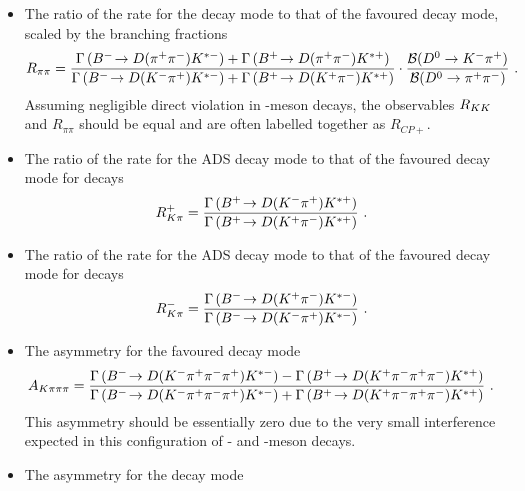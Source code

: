 \begin{itemize}
{{\begin{equation}
\label{eqn:Rkk}
\end{equation}
}}
\item{The ratio of the rate for the \decay{\D}{\pip\pim} decay mode to that of the favoured decay mode, scaled by the branching fractions
{\footnotesize
\begin{equation}
R_{\pi\pi} = \frac{\Gamma\left({{{B}^-}}\!\rightarrow {\ensuremath{D}}({{\pi}^+}{{\pi}^-}){{K}^{*-}}\right) + \Gamma\left({{{B}^+}}\!\rightarrow {\ensuremath{D}}({{\pi}^+}{{\pi}^-}){{K}^{*+}}\right)}{\Gamma\left({{{B}^-}}\!\rightarrow {\ensuremath{D}}({{K}^-}{{\pi}^+}){{K}^{*-}}\right) + \Gamma\left({{{B}^+}}\!\rightarrow {\ensuremath{D}}({{K}^+}{{\pi}^-}){{K}^{*+}}\right)} \cdot \frac{{\mathcal{B}}(D^0 \rightarrow K^-\pi^+)}{{\mathcal{B}}(D^0 \rightarrow \pi^+\pi^-)} \text{ . }
\label{eqn:Rpipi}
\end{equation}}
}
Assuming negligible direct \CP violation in \D-meson decays, the observables $R_{{K}{K}}$ and $R_{\pi\pi}$ should be equal and are often labelled together as $R_{CP+}$.
\item{The ratio of the rate for the ADS decay mode to that of the favoured decay mode for \Bp decays
{\footnotesize
\begin{equation}
R^+_{K\pi} = \frac{\Gamma\left({{{B}^+}}\!\rightarrow {\ensuremath{D}}({{K}^-}{{\pi}^+}){{K}^{*+}}\right)}{\Gamma\left({{{B}^+}}\!\rightarrow {\ensuremath{D}}({{K}^+}{{\pi}^-}){{K}^{*+}}\right)} \text{ . }
\label{eqn:Rplus}
\end{equation}
}}
\item{The ratio of the rate for the ADS decay mode to that of the favoured decay mode for \Bm decays
{\footnotesize
\begin{equation}
R^-_{K\pi} = \frac{\Gamma\left({{{B}^-}}\!\rightarrow {\ensuremath{D}}({{K}^+}{{\pi}^-}){{K}^{*-}}\right)}{\Gamma\left({{{B}^-}}\!\rightarrow {\ensuremath{D}}({{K}^-}{{\pi}^+}){{K}^{*-}}\right)} \text{ . }
\label{eqn:Rminus}
\end{equation}
}}
\item{The \CP asymmetry for the favoured \decay{\Dz}{\Km\pip\pim\pip} decay mode
{\footnotesize
\begin{equation}
A_{{K}\pi\pi\pi} = \frac{\Gamma\left({{{B}^-}}\!\rightarrow {\ensuremath{D}}({{K}^-}{{\pi}^+}{{\pi}^-}{{\pi}^+}){{K}^{*-}}\right) - \Gamma\left({{{B}^+}}\!\rightarrow {\ensuremath{D}}({{K}^+}{{\pi}^-}{{\pi}^+}{{\pi}^-}){{K}^{*+}}\right)}{\Gamma\left({{{B}^-}}\!\rightarrow {\ensuremath{D}}({{K}^-}{{\pi}^+}{{\pi}^-}{{\pi}^+}){{K}^{*-}}\right) + \Gamma\left({{{B}^+}}\!\rightarrow {\ensuremath{D}}({{K}^+}{{\pi}^-}{{\pi}^+}{{\pi}^-}){{K}^{*+}}\right)} \text{ . }
\label{eqn:Akpipipi}
\end{equation}}%
\noindent%
This asymmetry should be essentially zero due to the very small interference expected in this configuration of \B- and \D-meson decays.
}
\item{The \CP asymmetry for the \decay{\D}{\pip\pim\pip\pim} decay mode
{\footnotesize
\begin{equation}

\end{equation}}}
\end{itemize}
